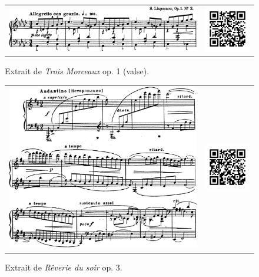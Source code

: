 \begin{figure}[!ht]
  \begin{bigcenter}
    \begin{tabular}{lr}
      \includegraphics[width=12.5cm, keepaspectratio]{op1.png}
      &
      \includegraphics[width=3cm, keepaspectratio]{op1-qr.png}
    \end{tabular}
  \end{bigcenter}
  \caption{\label{op1}Extrait de \emph{Trois Morceaux} op. 1  (valse).}
\end{figure}

\begin{figure}[!p]
  \begin{bigcenter}
    \begin{tabular}{lr}
      \includegraphics[width=12.5cm, keepaspectratio]{op3.png}
      &
      \includegraphics[width=3cm, keepaspectratio]{op3-qr.png}
    \end{tabular}
  \end{bigcenter}
  \caption{\label{op3}Extrait de \emph{Rêverie du soir} op. 3.}
\end{figure}

